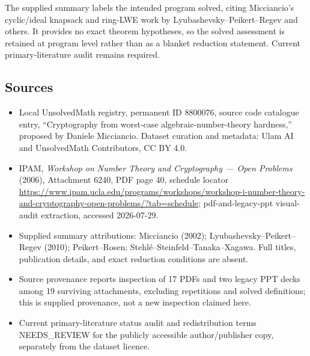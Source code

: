 \documentclass[11pt]{article}
\begin{document}
The supplied summary labels the intended program solved, citing Micciancio's cyclic/ideal knapsack and ring-LWE work by Lyubashevsky--Peikert--Regev and others. It provides no exact theorem hypotheses, so the solved assessment is retained at program level rather than as a blanket reduction statement. Current primary-literature audit remains required.
\subsection{Sources}
\begin{itemize}
\item Local UnsolvedMath registry, permanent ID 8800076, source code catalogue entry, ``Cryptography from worst-case algebraic-number-theory hardness,'' proposed by Daniele Micciancio. Dataset curation and metadata: Ulam AI and UnsolvedMath Contributors, CC BY 4.0.
\item IPAM, \emph{Workshop on Number Theory and Cryptography --- Open Problems} (2006), Attachment 6240, PDF page 40, schedule locator \url{https://www.ipam.ucla.edu/programs/workshops/workshop-i-number-theory-and-cryptography-open-problems/?tab=schedule}; pdf-and-legacy-ppt visual-audit extraction, accessed 2026-07-29.
\item Supplied summary attributions: Micciancio (2002); Lyubashevsky--Peikert--Regev (2010); Peikert--Rosen; Stehlé--Steinfeld--Tanaka--Xagawa. Full titles, publication details, and exact reduction conditions are absent.
\item Source provenance reports inspection of 17 PDFs and two legacy PPT decks among 19 surviving attachments, excluding repetitions and solved definitions; this is supplied provenance, not a new inspection claimed here.
\item Current primary-literature status audit and redistribution terms NEEDS\_REVIEW for the publicly accessible author/publisher copy, separately from the dataset licence.
\end{itemize}
\end{document}
